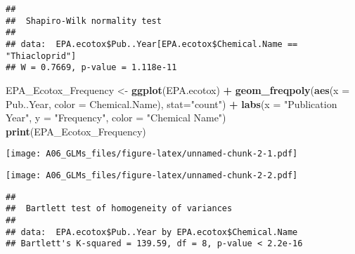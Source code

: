\documentclass[]{article}
\newenvironment{Shaded}{\begin{snugshade}}{\end{snugshade}}
\newcommand{\KeywordTok}[1]{\textcolor[rgb]{0.13,0.29,0.53}{\textbf{#1}}}
\newcommand{\DataTypeTok}[1]{\textcolor[rgb]{0.13,0.29,0.53}{#1}}
\newcommand{\StringTok}[1]{\textcolor[rgb]{0.31,0.60,0.02}{#1}}
\newcommand{\CommentTok}[1]{\textcolor[rgb]{0.56,0.35,0.01}{\textit{#1}}}
\newcommand{\OperatorTok}[1]{\textcolor[rgb]{0.81,0.36,0.00}{\textbf{#1}}}
\newcommand{\NormalTok}[1]{#1}
\begin{document}
\begin{verbatim}
## 
##  Shapiro-Wilk normality test
## 
## data:  EPA.ecotox$Pub..Year[EPA.ecotox$Chemical.Name == "Thiacloprid"]
## W = 0.7669, p-value = 1.118e-11
\end{verbatim}

\begin{Shaded}
\begin{Highlighting}[]
\NormalTok{EPA_Ecotox_Frequency <-}
\StringTok{  }\KeywordTok{ggplot}\NormalTok{(EPA.ecotox) }\OperatorTok{+}
\StringTok{  }\KeywordTok{geom_freqpoly}\NormalTok{(}\KeywordTok{aes}\NormalTok{(}\DataTypeTok{x =}\NormalTok{ Pub..Year, }\DataTypeTok{color =}\NormalTok{ Chemical.Name),}
                \DataTypeTok{stat=}\StringTok{"count"}\NormalTok{) }\OperatorTok{+}
\StringTok{  }\KeywordTok{labs}\NormalTok{(}\DataTypeTok{x =} \StringTok{"Publication Year"}\NormalTok{, }\DataTypeTok{y =} \StringTok{"Frequency"}\NormalTok{, }
                \DataTypeTok{color =} \StringTok{"Chemical Name"}\NormalTok{)}
\KeywordTok{print}\NormalTok{(EPA_Ecotox_Frequency)}
\end{Highlighting}
\end{Shaded}

\texttt{[image: A06\_GLMs\_files/figure-latex/unnamed-chunk-2-1.pdf]}

\begin{Shaded}
\end{Shaded}

\texttt{[image: A06\_GLMs\_files/figure-latex/unnamed-chunk-2-2.pdf]}

\begin{Shaded}
\end{Shaded}

\begin{verbatim}
## 
##  Bartlett test of homogeneity of variances
## 
## data:  EPA.ecotox$Pub..Year by EPA.ecotox$Chemical.Name
## Bartlett's K-squared = 139.59, df = 8, p-value < 2.2e-16
\end{verbatim}
\end{document}
